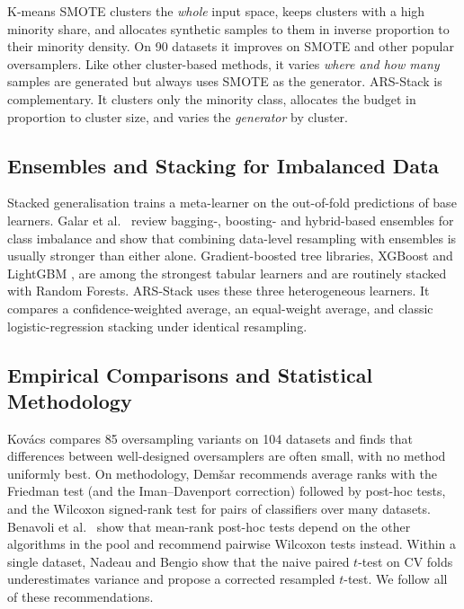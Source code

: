 \documentclass[11pt,a4paper]{article}
\begin{document}
K-means SMOTE \cite{douzas2018kmeanssmote} clusters the \emph{whole} input space, keeps clusters with a high minority share, and allocates synthetic samples to them in inverse proportion to their minority density. On 90 datasets it improves on SMOTE and other popular oversamplers. Like other cluster-based methods, it varies \emph{where and how many} samples are generated but always uses SMOTE as the generator. ARS-Stack is complementary. It clusters only the minority class, allocates the budget in proportion to cluster size, and varies the \emph{generator} by cluster.

\subsection{Ensembles and Stacking for Imbalanced Data}

Stacked generalisation \cite{wolpert1992stacked} trains a meta-learner on the out-of-fold predictions of base learners. Galar et al.\ \cite{galar2012review} review bagging-, boosting- and hybrid-based ensembles for class imbalance and show that combining data-level resampling with ensembles is usually stronger than either alone. Gradient-boosted tree libraries, XGBoost \cite{chen2016xgboost} and LightGBM \cite{ke2017lightgbm}, are among the strongest tabular learners and are routinely stacked with Random Forests. ARS-Stack uses these three heterogeneous learners. It compares a confidence-weighted average, an equal-weight average, and classic logistic-regression stacking under identical resampling.

\subsection{Empirical Comparisons and Statistical Methodology}

Kov{\'a}cs \cite{kovacs2019empirical} compares 85 oversampling variants on 104 datasets and finds that differences between well-designed oversamplers are often small, with no method uniformly best. On methodology, Dem{\v{s}}ar \cite{demsar2006statistical} recommends average ranks with the Friedman test (and the Iman--Davenport correction) followed by post-hoc tests, and the Wilcoxon signed-rank test for pairs of classifiers over many datasets. Benavoli et al.\ \cite{benavoli2016posthoc} show that mean-rank post-hoc tests depend on the other algorithms in the pool and recommend pairwise Wilcoxon tests instead. Within a single dataset, Nadeau and Bengio \cite{nadeau2003inference} show that the naive paired $t$-test on CV folds underestimates variance and propose a corrected resampled $t$-test. We follow all of these recommendations.
\end{document}
